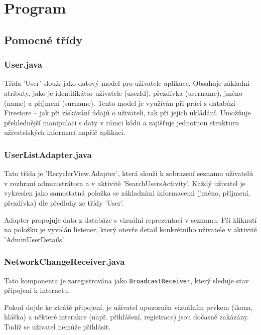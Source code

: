 \chapter{Program}

\section{Pomocné třídy}


\subsection*{User.java}

Třída 'User' slouží jako datový model pro uživatele aplikace. Obsahuje základní atributy, jako je identifikátor uživatele (userId), přezdívka (username), jméno (name) a příjmení (surname). Tento model je využíván při práci s databází Firestore – jak při získávání údajů o uživateli, tak při jejich ukládání. Umožňuje přehlednější manipulaci s daty v rámci kódu a zajišťuje jednotnou strukturu uživatelských informací napříč aplikací.


\subsection*{UserListAdapter.java}

Tato třída je 'RecyclerView.Adapter', která slouží k zobrazení seznamu uživatelů v rozhraní administrátora a v aktivitě 'SearchUsersActivity'. Každý uživatel je vykreslen jako samostatná položka se základními informacemi (jméno, příjmení, přezdívka) dle předlohy ze třídy 'User'.

Adapter propojuje data z databáze s vizuální reprezentací v seznamu. Při kliknutí na položku je vyvolán listener, který otevře detail konkrétního uživatele v aktivitě 'AdminUserDetails'.






\subsection*{NetworkChangeReceiver.java}

Tato komponenta je zaregistrována jako \texttt{BroadcastReceiver}, který sleduje stav připojení k internetu. 

Pokud dojde ke ztrátě připojení, je uživatel upozorněn vizuálním prvkem (ikona, hláška) a některé interakce (např. přihlášení, registrace) jsou dočasně zakázány. Tudíž se uživatel nemůže přihlásit.

